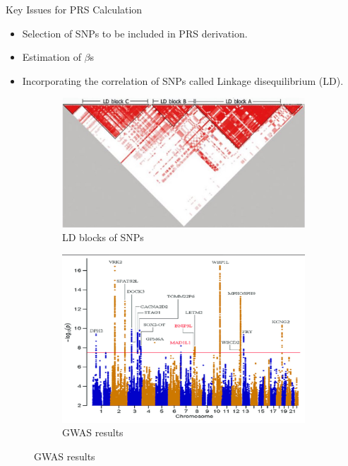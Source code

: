 \documentclass{beamer}
\begin{document}
\begin{frame}{Key Issues for PRS Calculation}
\begin{itemize}
\item Selection of SNPs to be included in PRS derivation. 
\item Estimation of $\beta$s
\item Incorporating the correlation of SNPs called Linkage disequilibrium (LD). 
\end{itemize}


\begin{figure}
\centering
\begin{subfigure}{.5\textwidth}
  \centering
  \includegraphics[width=.8\linewidth]{images/LD.jpg}
  \caption{LD blocks of SNPs}
  \label{fig:distribution}
\end{subfigure}%
\begin{subfigure}{.5\textwidth}
  \centering
  \includegraphics[width=.8\linewidth]{images/GWAS_SCZ.png}
  \caption{GWAS results}
  \label{fig:GWAS}
\end{subfigure}
\label{fig:}
\end{figure}


\end{frame}
\end{document}
